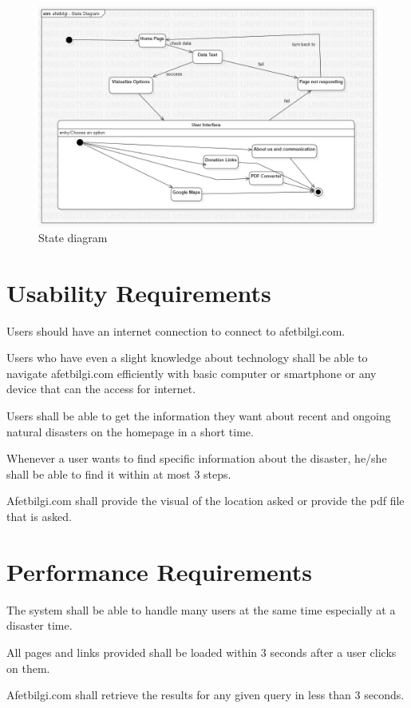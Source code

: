\documentclass[12pt]{report}
\begin{document}
\begin{figure}[H]
    \includegraphics[scale=0.5]{state1}
    \centering
    \caption{State diagram}
\end{figure}

\section{Usability Requirements}
Users should have an internet connection to connect to afetbilgi.com.

Users who have even a slight knowledge about technology shall be able to navigate afetbilgi.com efficiently with basic computer or smartphone or any device that can the access for internet.

Users shall be able to get the information they want about recent and ongoing natural disasters on the homepage in a short time.

Whenever a user wants to find specific information about the disaster, he/she shall be able to find it within at most 3 steps.

Afetbilgi.com shall provide the visual of the location asked or provide the pdf file that is asked.

\section{Performance Requirements}
The system shall be able to handle many users at the same time especially at a disaster time.

All pages and links provided shall be loaded within 3 seconds after a user clicks on them.

Afetbilgi.com shall retrieve the results for any given query in less than 3 seconds.
\end{document}

